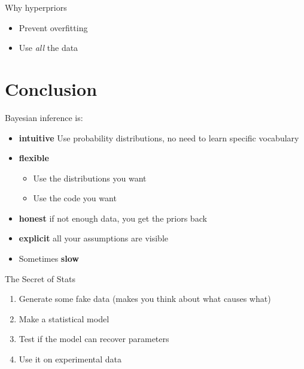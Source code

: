 \documentclass[aspectratio=169,xcolor=svgnames]{beamer}
\begin{document}
\begin{frame}
  \begin{block}{Why hyperpriors}
    \begin{itemize}
    \item Prevent overfitting
    \item Use \emph{all} the data
    \end{itemize}
  \end{block}
\end{frame}

\section{Conclusion}

\begin{frame}
  \begin{block}{Bayesian inference is:}
  \begin{itemize}
  \item \textbf{intuitive} Use probability distributions, no need to learn specific vocabulary
  \item \textbf{flexible}
    \begin{itemize}
    \item Use the distributions you want
    \item Use the code you want
    \end{itemize}
  \item \textbf{honest} if not enough data, you get the priors back
  \item \textbf{explicit} all your assumptions are visible
  \item<2-> Sometimes \textbf{slow}
  \end{itemize}
  \end{block}
\end{frame}

\begin{frame}
  \begin{block}{The Secret of Stats}
    \begin{enumerate}
    \item Generate some fake data (makes you think about what causes what)
    \item Make a statistical model
    \item Test if the model can recover parameters
    \item Use it on experimental data
    \end{enumerate}
  \end{block}
\end{frame}
\end{document}
